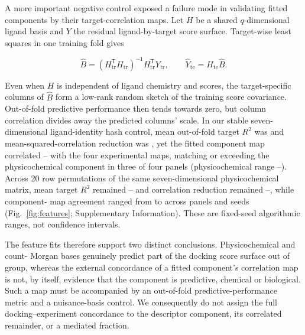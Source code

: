 \documentclass[11pt]{article}
\begin{document}
A more important negative control exposed a failure mode in validating fitted components by
their target-correlation maps. Let $H$ be a shared $q$-dimensional ligand basis and $Y$ the
residual ligand-by-target score surface. Target-wise least squares in one training fold gives

\begin{equation}
\widehat B=(H_{\mathrm{tr}}^{\mathsf T}H_{\mathrm{tr}})^{-1}
H_{\mathrm{tr}}^{\mathsf T}Y_{\mathrm{tr}},\qquad
\widehat Y_{\mathrm{te}}=H_{\mathrm{te}}\widehat B.
\label{eq:nuisanceprojection}
\end{equation}

Even when $H$ is independent of ligand chemistry and scores, the target-specific columns of
$\widehat B$ form a low-rank random sketch of the training score covariance. Out-of-fold
predictive performance then tends towards zero, but column correlation divides away the
predicted columns' scale. In our stable seven-dimensional ligand-identity hash control, mean out-of-fold target
$R^2$ was \FixedHashOOFRtwo{} and mean-squared-correlation reduction was
\FixedHashCorrelationReduction{}, yet the fitted
component map correlated \FixedHashGeometryLow{}--\FixedHashGeometryHigh{} with the four
experimental maps, matching or exceeding the physicochemical component in three of four
panels (physicochemical range \FixedPhyschemGeometryLow{}--\FixedPhyschemGeometryHigh{}).
Across 20 row permutations of
the same seven-dimensional physicochemical matrix, mean target $R^2$ remained
\NuisanceOOFRtwoLow{}--\NuisanceOOFRtwoHigh{} and correlation reduction remained
\NuisanceCorrelationReductionLow{}--\NuisanceCorrelationReductionHigh{}, while component-
map agreement ranged from \NuisanceGeometryLow{} to \NuisanceGeometryHigh{} across panels
and seeds (Fig.~\ref{fig:features}; Supplementary Information). These are fixed-seed
algorithmic ranges, not confidence intervals.

The feature fits therefore support two distinct conclusions. Physicochemical and count-
Morgan bases genuinely predict part of the docking score surface out of group, whereas the
external concordance of a fitted component's correlation map is not, by itself, evidence
that the component is predictive, chemical or biological. Such a map must be accompanied by
an out-of-fold predictive-performance metric and a nuisance-basis control. We consequently do not assign
the full docking--experiment concordance to the descriptor component, its correlated
remainder, or a mediated fraction.
\end{document}
